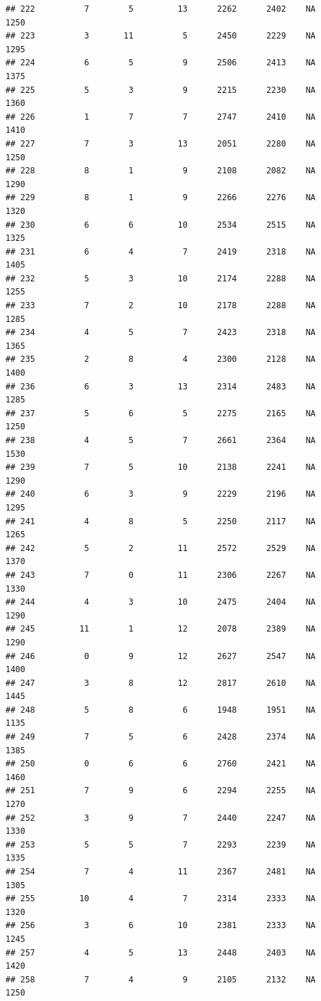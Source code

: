 \documentclass[]{book}
\begin{document}
\begin{verbatim}
## 222          7        5         13      2262      2402    NA    1250
## 223          3       11          5      2450      2229    NA    1295
## 224          6        5          9      2506      2413    NA    1375
## 225          5        3          9      2215      2230    NA    1360
## 226          1        7          7      2747      2410    NA    1410
## 227          7        3         13      2051      2280    NA    1250
## 228          8        1          9      2108      2082    NA    1290
## 229          8        1          9      2266      2276    NA    1320
## 230          6        6         10      2534      2515    NA    1325
## 231          6        4          7      2419      2318    NA    1405
## 232          5        3         10      2174      2288    NA    1255
## 233          7        2         10      2178      2288    NA    1285
## 234          4        5          7      2423      2318    NA    1365
## 235          2        8          4      2300      2128    NA    1400
## 236          6        3         13      2314      2483    NA    1285
## 237          5        6          5      2275      2165    NA    1250
## 238          4        5          7      2661      2364    NA    1530
## 239          7        5         10      2138      2241    NA    1290
## 240          6        3          9      2229      2196    NA    1295
## 241          4        8          5      2250      2117    NA    1265
## 242          5        2         11      2572      2529    NA    1370
## 243          7        0         11      2306      2267    NA    1330
## 244          4        3         10      2475      2404    NA    1290
## 245         11        1         12      2078      2389    NA    1290
## 246          0        9         12      2627      2547    NA    1400
## 247          3        8         12      2817      2610    NA    1445
## 248          5        8          6      1948      1951    NA    1135
## 249          7        5          6      2428      2374    NA    1385
## 250          0        6          6      2760      2421    NA    1460
## 251          7        9          6      2294      2255    NA    1270
## 252          3        9          7      2440      2247    NA    1330
## 253          5        5          7      2293      2239    NA    1335
## 254          7        4         11      2367      2481    NA    1305
## 255         10        4          7      2314      2333    NA    1320
## 256          3        6         10      2381      2333    NA    1245
## 257          4        5         13      2448      2403    NA    1420
## 258          7        4          9      2105      2132    NA    1250

\end{verbatim}
\end{document}

